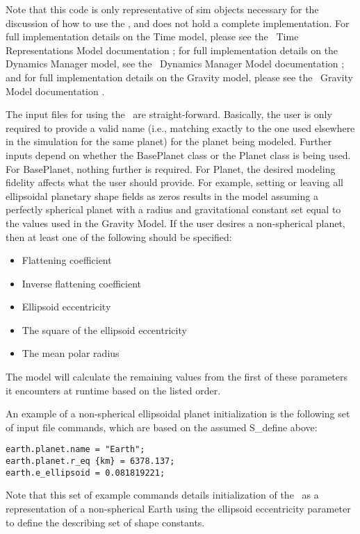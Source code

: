 Note that this code is only representative of sim objects necessary for the
discussion of how to use the \planetDesc, and does not hold a
complete implementation. For full implementation details on the Time model,
please see the \JEODid\ Time Representations Model documentation
\cite{dynenv:TIME}; for full implementation details on the Dynamics Manager
model, see the \JEODid\ Dynamics Manager Model documentation
\cite{dynenv:DYNMANAGER}; and for full implementation details on the Gravity
model, please see the \JEODid\ Gravity Model documentation
\cite{dynenv:GRAVITY}.

The input files for using the \planetDesc\ are straight-forward. Basically, the user
is only required to provide a valid name (i.e., matching exactly to the one used
elsewhere in the simulation for the same planet) for the planet being modeled.
Further inputs depend on whether the BasePlanet class or the Planet class is
being used. For BasePlanet, nothing further is required. For Planet, the desired
modeling fidelity affects what the user should provide. For example, setting or
leaving all ellipsoidal planetary shape fields as zeros results in
the model assuming a perfectly spherical planet with a radius and gravitational
constant set equal to the values used in the Gravity Model. If the user desires
a non-spherical planet, then at least one of the following should be specified:
\begin{itemize}
\item Flattening coefficient
\item Inverse flattening coefficient
\item Ellipsoid eccentricity
\item The square of the ellipsoid eccentricity
\item The mean polar radius
\end{itemize}
The model will calculate the remaining values from the first of these
parameters it encounters at runtime based on the listed order.

An example of a non-spherical ellipsoidal planet initialization is the following
set of input file commands, which are based on the assumed S\_define above:

\begin{verbatim}
earth.planet.name = "Earth";
earth.planet.r_eq {km} = 6378.137;
earth.e_ellipsoid = 0.081819221;
\end{verbatim}

Note that this set of example commands details initialization of the
\planetDesc\ as a representation of a non-spherical Earth using the ellipsoid
eccentricity parameter to define the describing set of shape constants.


